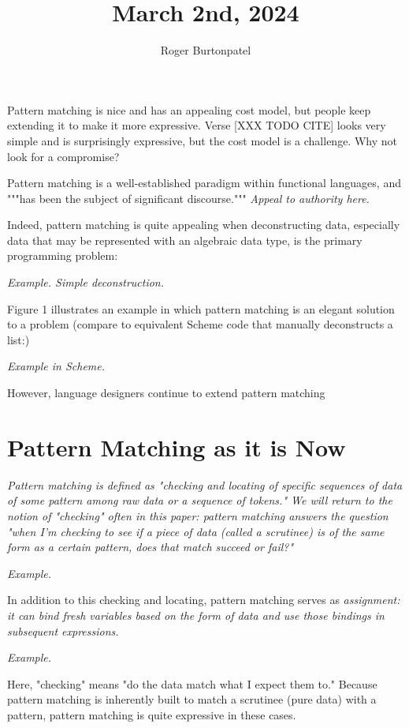 \documentclass{article}
\title{March 2nd, 2024}
\author{Roger Burtonpatel}
\begin{document}
\maketitle

Pattern matching is nice and has an appealing cost model, but people keep
extending it to make it more expressive. Verse [XXX TODO CITE] looks very simple
and is surprisingly expressive, but the cost model is a challenge. Why not look
for a compromise?

Pattern matching is a well-established paradigm within functional languages, and
"""has been the subject of significant discourse.""" \it{Appeal to authority here.}

Indeed, pattern matching is quite appealing when deconstructing data, especially 
data that may be represented with an algebraic data type, is the primary programming problem: 

\it{Example. Simple deconstruction.}

Figure 1 illustrates an example in which pattern matching is an elegant solution 
to a problem (compare to equivalent Scheme code that manually deconstructs a list:)

\it{Example in Scheme.}

However, language designers continue to extend pattern matching 

\section{Pattern Matching as it is Now}
\it{Pattern matching} is defined as "checking and locating of specific sequences
of data of some pattern among raw data or a sequence of tokens." We will return
to the notion of "checking" often in this paper: pattern matching answers the
question "when I'm checking to see if a piece of data (called a \it{scrutinee})
is of the same form as a certain pattern, does that match succeed or fail?"

\it{Example}.

In addition to this checking and locating, pattern matching serves as
\it{assignment}: it can bind fresh variables based on the form of data and use
those bindings in subsequent expressions. 

\it{Example}.

Here, "checking" means "do the data match what I expect them to." Because
pattern matching is inherently built to match a scrutinee (pure data) with a
pattern, pattern matching is quite expressive in these cases. 
\end{document}
